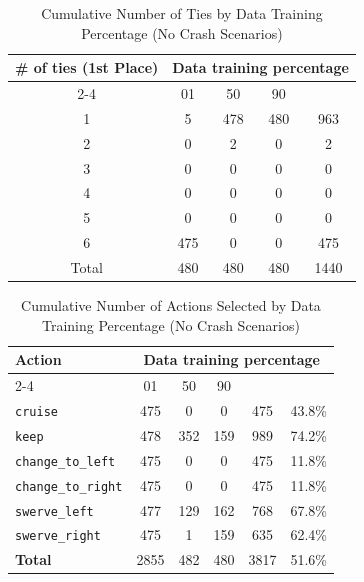 \documentclass{article}
\begin{document}
\begin{table}[h]
\centering
\caption{Cumulative Number of Ties by Data Training Percentage (No Crash Scenarios)}
\begin{tabular}{c|ccc|c}
\toprule
\multirow{2}{*}{\# of ties (1st Place)} & \multicolumn{5}{c|}{Data training percentage} & \multirow{2}{*}{Total} \\
\cmidrule{2-4}
 & 01 & 50 & 90 & \\
\midrule
1 & 5 & 478 & 480 & 963 \\ 
2 & 0 & 2 & 0 & 2 \\ 
3 & 0 & 0 & 0 & 0 \\ 
4 & 0 & 0 & 0 & 0 \\ 
5 & 0 & 0 & 0 & 0 \\ 
6 & 475 & 0 & 0 & 475 \\ 
\midrule
Total & 480 & 480 & 480 & 1440 \\ 
\bottomrule
\end{tabular}
\end{table}

\begin{table}[h]
\centering
\caption{Cumulative Number of Actions Selected by Data Training Percentage (No Crash Scenarios)}
\begin{tabular}{l|ccc|c|c}
\toprule
\multirow{2}{*}{Action} & \multicolumn{5}{c|}{Data training percentage} & \multirow{2}{*}{Total} & \multirow{2}{*}{Safe (\%)} \\
\cmidrule{2-4}
 & 01 & 50  & 90 & & \\
\midrule
\texttt{cruise} & 475 & 0 & 0 & 475 & 43.8\% \\ 
\texttt{keep} & 478 & 352 & 159 & 989 & 74.2\% \\ 
\texttt{change\_to\_left} & 475 & 0 & 0 & 475 & 11.8\% \\ 
\texttt{change\_to\_right} & 475 & 0 & 0 & 475 & 11.8\% \\ 
\texttt{swerve\_left} & 477 & 129 & 162 & 768 & 67.8\% \\ 
\texttt{swerve\_right} & 475 & 1 & 159 & 635 & 62.4\% \\ 
\midrule
\textbf{Total} & 2855 & 482 & 480 & 3817 & 51.6\% \\ 
\bottomrule
\end{tabular}
\end{table}
\end{document}
